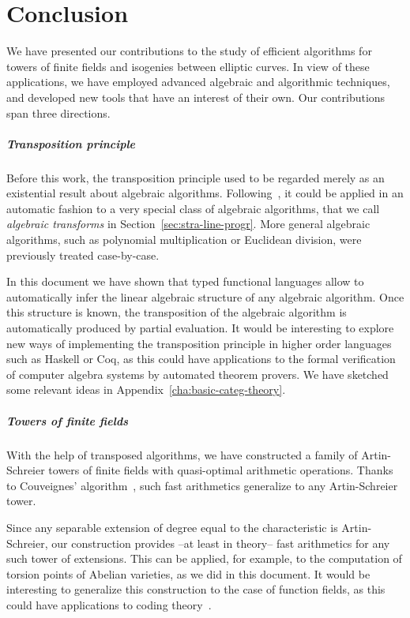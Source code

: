 

\chapter{Conclusion}

We have presented our contributions to the study of efficient
algorithms for towers of finite fields and isogenies between elliptic
curves. In view of these applications, we have employed advanced
algebraic and algorithmic techniques, and developed new tools that
have an interest of their own. Our contributions span three directions.

\paragraph{Transposition principle}
Before this work, the transposition principle used to be regarded
merely as an existential result about algebraic algorithms.
Following~\cite{bostan+lecerf+schost:tellegen}, it could be applied in
an automatic fashion to a very special class of algebraic algorithms,
that we call \emph{algebraic transforms} in
Section~\ref{sec:stra-line-progr}. More general algebraic algorithms,
such as polynomial multiplication or Euclidean division, were
previously treated case-by-case.

In this document we have shown that typed functional languages allow
to automatically infer the linear algebraic structure of any algebraic
algorithm. Once this structure is known, the transposition of the
algebraic algorithm is automatically produced by partial evaluation.
It would be interesting to explore new ways of implementing the
transposition principle in higher order languages such as Haskell or
Coq, as this could have applications to the formal verification of
computer algebra systems by automated theorem provers.  We have
sketched some relevant ideas in Appendix~\ref{cha:basic-categ-theory}.

\paragraph{Towers of finite fields}
With the help of transposed algorithms, we have constructed a family
of Artin-Schreier towers of finite fields with quasi-optimal
arithmetic operations. Thanks to Couveignes'
algorithm~\cite{couveignes00}, such fast arithmetics generalize to any
Artin-Schreier tower.

Since any separable extension of degree equal to the characteristic is
Artin-Schreier, our construction provides --at least in theory-- fast
arithmetics for any such tower of extensions.  This can be applied,
for example, to the computation of torsion points of Abelian
varieties, as we did in this document. It would be interesting to
generalize this construction to the case of function fields, as this
could have applications to coding
theory~\cite{garcia+stichtenoth96,shum-et-al01}.

